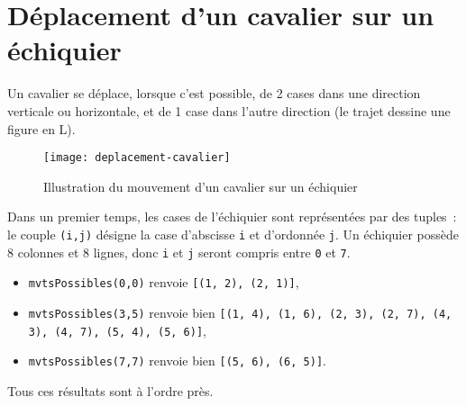 \vspace{-0.5cm}
\section*{Déplacement d'un cavalier sur un échiquier}


Un cavalier se déplace, lorsque c'est possible, de 2 cases dans une direction verticale ou horizontale, et de 1 case dans l'autre direction (le trajet dessine une figure en L).

\begin{figure}[h]
	\begin{center}
		\texttt{[image: deplacement-cavalier]}
	\end{center}
	\caption{Illustration du mouvement d'un cavalier sur un échiquier}
\end{figure}

Dans un premier temps, les cases de l'échiquier sont représentées par des tuples~: le couple \texttt{(i,j)} désigne la case d'abscisse \texttt{i} et d'ordonnée \texttt{j}. Un échiquier possède 8 colonnes et 8 lignes, donc \texttt{i} et \texttt{j} seront compris entre \texttt{0} et \texttt{7}.



{}
\vspace{-.2cm}
\begin{itemize}
	\item \texttt{mvtsPossibles(0,0)} renvoie \texttt{[(1, 2), (2, 1)]},
	\item \texttt{mvtsPossibles(3,5)} renvoie bien \texttt{[(1, 4), (1, 6), (2, 3), (2, 7), (4, 3), (4, 7), (5, 4), (5, 6)]},
	\item \texttt{mvtsPossibles(7,7)} renvoie bien \texttt{[(5, 6), (6, 5)]}.
\end{itemize}

Tous ces résultats sont à l'ordre près. 


